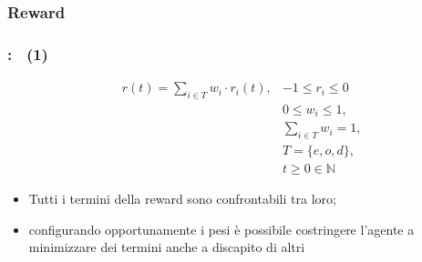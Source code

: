 \documentclass[compress]{beamer}
\begin{document}
\subsubsection{Reward}
\begin{frame}
    \frametitle{\subsecname: \subsubsecname\ (1)}
    \begin{Definition}
        \begin{equation}
            \label{eq:reward}
            \begin{aligned}
                & r(t) = \sum_{i \in T} w_i \cdot r_i(t), & -1 \leq r_i \leq 0\\
                && 0 \leq w_i \leq 1, \\
                && \sum_{i \in T} w_i = 1, \\
                && T = \{e, o, d\},\\
                && t \geq 0 \in \mathbb{N}
            \end{aligned}
        \end{equation}
    \end{Definition}
    \only<+> {\begin{itemize}
        \item Tutti i termini della reward sono confrontabili tra loro;
        \item configurando opportunamente i pesi è possibile costringere l'agente
        a minimizzare dei termini anche a discapito di altri
    \end{itemize}}
\end{frame}
\end{document}
